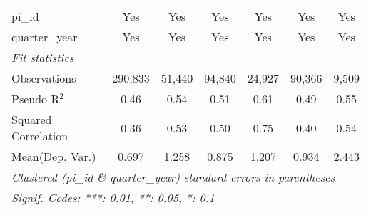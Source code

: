 \begin{tabular}{lcccccc}
   pi\_id                                                     & Yes           & Yes          & Yes            & Yes           & Yes            & Yes\\  
   quarter\_year                                              & Yes           & Yes          & Yes            & Yes           & Yes            & Yes\\  
   \midrule
   \emph{Fit statistics}\\
   Observations                                               & 290,833       & 51,440       & 94,840         & 24,927        & 90,366         & 9,509\\  
   Pseudo R$^2$                                               & 0.46          & 0.54         & 0.51           & 0.61          & 0.49           & 0.55\\  
   Squared Correlation                                        & 0.36          & 0.53         & 0.50           & 0.75          & 0.40           & 0.54\\  
Mean(Dep. Var.) & 0.697 & 1.258 & 0.875 & 1.207 & 0.934 & 2.443 \\
   \midrule \midrule
   \multicolumn{7}{l}{\emph{Clustered (pi\_id \& quarter\_year) standard-errors in parentheses}}\\
   \multicolumn{7}{l}{\emph{Signif. Codes: ***: 0.01, **: 0.05, *: 0.1}}\\
\end{tabular}
\par\endgroup
